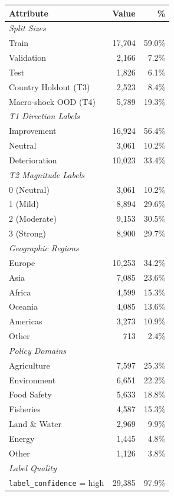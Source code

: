 \begin{table}[t]
\centering
\small
\begin{tabular}{lrr}
\toprule
\textbf{Attribute} & \textbf{Value} & \textbf{\%} \\
\midrule
\multicolumn{3}{l}{\textit{Split Sizes}} \\
Train & 17,704 & 59.0\% \\
Validation & 2,166 & 7.2\% \\
Test & 1,826 & 6.1\% \\
Country Holdout (T3) & 2,523 & 8.4\% \\
Macro-shock OOD (T4) & 5,789 & 19.3\% \\
\midrule
\multicolumn{3}{l}{\textit{T1 Direction Labels}} \\
Improvement & 16,924 & 56.4\% \\
Neutral & 3,061 & 10.2\% \\
Deterioration & 10,023 & 33.4\% \\
\midrule
\multicolumn{3}{l}{\textit{T2 Magnitude Labels}} \\
0 (Neutral) & 3,061 & 10.2\% \\
1 (Mild) & 8,894 & 29.6\% \\
2 (Moderate) & 9,153 & 30.5\% \\
3 (Strong) & 8,900 & 29.7\% \\
\midrule
\multicolumn{3}{l}{\textit{Geographic Regions}} \\
Europe & 10,253 & 34.2\% \\
Asia & 7,085 & 23.6\% \\
Africa & 4,599 & 15.3\% \\
Oceania & 4,085 & 13.6\% \\
Americas & 3,273 & 10.9\% \\
Other & 713 & 2.4\% \\
\midrule
\multicolumn{3}{l}{\textit{Policy Domains}} \\
Agriculture & 7,597 & 25.3\% \\
Environment & 6,651 & 22.2\% \\
Food Safety & 5,633 & 18.8\% \\
Fisheries & 4,587 & 15.3\% \\
Land \& Water & 2,969 & 9.9\% \\
Energy & 1,445 & 4.8\% \\
Other & 1,126 & 3.8\% \\
\midrule
\multicolumn{3}{l}{\textit{Label Quality}} \\
\texttt{label\_confidence} = high & 29,385 & 97.9\% \\

\end{tabular}
\end{table}
